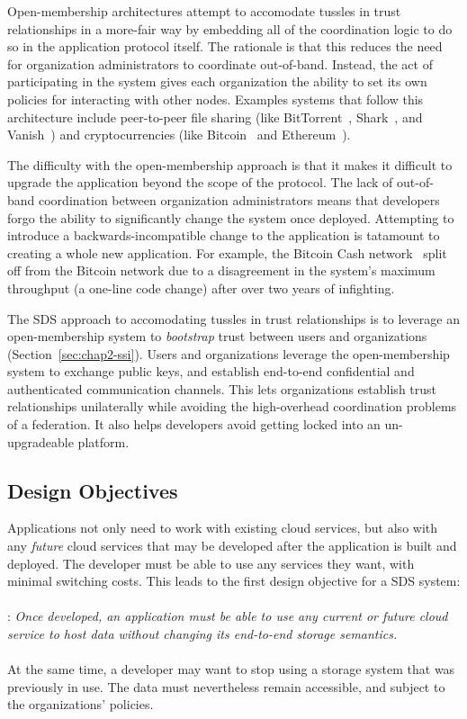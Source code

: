 Open-membership architectures attempt to accomodate tussles in trust
relationships in a more-fair way by embedding all of the coordination logic to do so in the
application protocol itself.  The rationale is
that this reduces the need for organization administrators to coordinate
out-of-band.  Instead, the act of participating in the system gives
each organization the ability to set its own policies for interacting with other
nodes.  Examples systems that follow this architecture include peer-to-peer file sharing
(like BitTorrent~\cite{bittorrent}, Shark~\cite{shark}, and Vanish~\cite{vanish})
and cryptocurrencies (like Bitcoin~\cite{bitcoin} and Ethereum~\cite{ethereum}).

The difficulty with the open-membership approach is that
it makes it difficult to upgrade the application beyond the scope of the
protocol.  The lack of out-of-band coordination between organization
administrators means that developers forgo the ability to significantly change the
system once deployed.  Attempting to introduce a backwards-incompatible change to the
application is tatamount to creating a whole new application.  For example,
the Bitcoin Cash network~\cite{bcash} split off from the Bitcoin network 
due to a disagreement in the system's maximum throughput (a one-line code
change) after over two years of infighting.

The SDS approach to accomodating tussles in trust relationships is to leverage
an open-membership system to \emph{bootstrap} trust between
users and organizations (Section~\ref{sec:chap2-ssi}).  Users and
organizations leverage the open-membership system to exchange public keys, and
establish end-to-end confidential and authenticated communication channels.
This lets organizations establish trust relationships unilaterally while
avoiding the high-overhead coordination problems of a
federation.  It also helps developers avoid getting locked into an un-upgradeable
platform.

\subsection{Design Objectives}

Applications not only need to work with existing cloud services, but also with
any \emph{future} cloud services that may be developed after the application is
built and deployed.  The developer must be able to use any services they want,
with minimal switching costs.  This leads to the first design objective for a SDS
system:
\\
\\
: \emph{Once developed, an application must be
able to use any current or future 
cloud service to host data without changing its end-to-end storage semantics.}
\\
\\
At the same time, a developer may want to stop using a storage system that was
previously in use.  The data must nevertheless remain accessible, and subject to
the organizations' policies.

